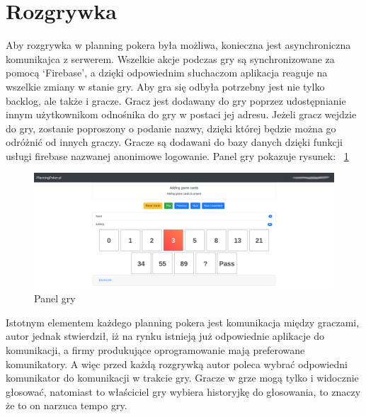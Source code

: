\section{Rozgrywka}

Aby rozgrywka w planning pokera była możliwa,
konieczna jest asynchroniczna komunikajca z serwerem.
Wszelkie akcje podczas gry są synchronizowane za pomocą `Firebase',
a dzięki odpowiednim słuchaczom aplikacja reaguje na wszelkie zmiany w stanie gry.
Aby gra się odbyła potrzebny jest nie tylko backlog, ale także i gracze.
Gracz jest dodawany do gry poprzez udostępnianie innym użytkownikom odnośnika do gry w postaci jej adresu.
Jeżeli gracz wejdzie do gry, zostanie poproszony o podanie nazwy,
dzięki której będzie można go odróżnić od innych graczy.
Gracze są dodawani do bazy danych dzięki funkcji usługi firebase nazwanej anonimowe logowanie.
Panel gry pokazuje rysunek:
~\ref{rys:gra}
\begin{figure}
	\centering\includegraphics[width=.7\textwidth]{img/gra}
	\caption{Panel gry}\label{rys:gra}%
\end{figure}
Istotnym elementem każdego planning pokera jest komunikacja między graczami,
autor jednak stwierdził,
iż na rynku istnieją już odpowiednie aplikacje do komunikacji,
a firmy produkujące oprogramowanie mają preferowane komunikatory.
A więc przed każdą rozgrywką autor poleca wybrać odpowiedni komunikator do komunikacji w trakcie gry.
Gracze w grze mogą tylko i widocznie głosować,
natomiast to właściciel gry wybiera historyjkę do głosowania, to znaczy że to on narzuca tempo gry.